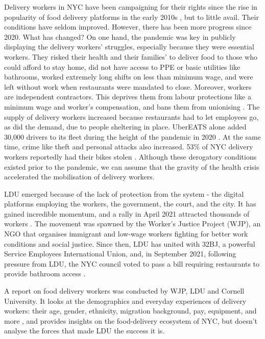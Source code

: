 \documentclass{article}[12pt]
\begin{document}
Delivery workers in NYC have been campaigning for their rights since the rise in popularity of food delivery platforms in the early 2010s \parencite{nytimes2014apps}, but to little avail. Their conditions have seldom improved. However, there has been more progress since 2020. What has changed? On one hand, the pandemic was key in publicly displaying the delivery workers’ struggles, especially because they were essential workers. 
They risked their health and their families’ to deliver food to those who could afford to stay home, did not have access to PPE or basic utilities like bathrooms, worked extremely long shifts on less than minimum wage, and were left without work when restaurants were mandated to close. 
Moreover, workers are independent contractors. This deprives them from labour protections like a minimum wage and worker’s compensation, and bans them from unionising \parencite{dunn2019hustle}.
The supply of delivery workers increased because restaurants had to let employees go, as did the demand, due to people sheltering in place. UberEATS alone added 30,000 drivers to its fleet during the height of the pandemic in 2020 \parencite{ldu_report2021}. At the same time, crime like theft and personal attacks also increased. 53\% of NYC delivery workers reportedly had their bikes stolen \parencite{brictv}.
Although these derogatory conditions existed prior to the pandemic, we can assume that the gravity of the health crisis accelerated the mobilisation of delivery workers.

LDU emerged because of the lack of protection from the system \parencite{lee2018delivering} - the digital platforms employing the workers, the government, the court, and the city. It has gained incredible momentum, and a rally in April 2021 attracted thousands of workers \parencite{aponte_2021}. The movement was spawned by the Worker’s Justice Project (WJP), an NGO that organises immigrant and low-wage workers fighting for better work conditions and social justice. 
Since then, LDU has united with 32BJ, a powerful Service Employees International Union, and, in September 2021, following pressure from LDU, the NYC council voted to pass a bill requiring restaurants to provide bathroom access \parencite{vice2021bathroom}.

A report on food delivery workers was conducted by WJP, LDU and Cornell University. It looks at the demographics and everyday experiences of delivery workers: their age, gender, ethnicity, migration background, pay, equipment, and more \parencite{ldu_report2021}, and provides insights on the food-delivery ecosystem of NYC, but doesn’t analyse the forces that made LDU the success it is.
\end{document}
